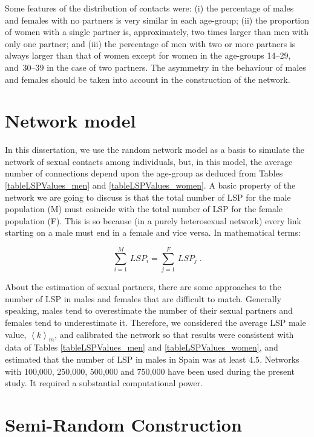 Some features of the distribution of contacts were: (i) the percentage of males and females with no partners is
very similar in each age-group; (ii) the proportion of women  with a single partner is, approximately, two times larger than men with only one partner; and (iii) the percentage of men with two or more partners is always larger than that of women except for women in the age-groups 14--29, and~30--39 in the case of two partners. The asymmetry in the behaviour of males and females should be taken into account in the construction of the network.

\section{Network model}

In this dissertation, we use the random network model as a basis to simulate the network of sexual contacts among individuals, but, in this model, the average number of connections depend upon the age-group as deduced from Tables \ref{tableLSPValues_men} and \ref{tableLSPValues_women}. A basic property of the network we are going to discuss is that the total number of LSP for the male population (M) must coincide with the total number of LSP for the female population (F). This is so because (in a purely heterosexual network) every link starting on a male must end in a female and vice versa. In mathematical terms:

\begin{equation}
\label{nodeseq}
\displaystyle\sum_{i=1}^M\, LSP_i=\displaystyle\sum_{j=1}^F\, LSP_j\; .
\end{equation}

About the estimation of sexual partners, there are some approaches to the number of LSP in males and females \cite{chandra2013sexual,mosher2005sexual} that are difficult to match. Generally speaking, males tend to overestimate the number of their sexual partners and females tend to underestimate it. Therefore, we considered the average LSP male value, $\left\langle k \right\rangle_m$, and calibrated the network so that results were consistent with data of Tables \ref{tableLSPValues_men} and \ref{tableLSPValues_women}, and estimated that the number of LSP in males in Spain was at least $4.5$. Networks with 100,000, 250,000, 500,000 and 750,000 have been used during the present study. It required a substantial computational power.

\section{Semi-Random Construction}
\label{subsec22}

